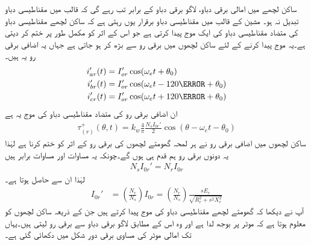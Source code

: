 ساکن لچھے میں امالی برقی دباو،  لاگو برقی دباو کے برابر تب رہے گی کہ قالب میں مقناطیسی دباو تبدیل نہ ہو۔ مشین کے قالب میں مقناطیسی دباو برقرار یوں رہتی ہے کہ ساکن لچھے  مقناطیسی دباو   کی متضاد مقناطیسی دباو کی ایک موج پیدا کرتی ہے جو اس کے اثر کو مکمل طور پر ختم کر دیتی ہے۔یہ موج پیدا کرنے کے لئے ساکن لچھوں میں برقی رو  سے بڑھ کر  ہو جاتی ہے جہاں یہ اضافی برقی رو یہ ہیں۔
\begin{gather}
\begin{aligned}\label{مساوات_امالی_تین_رو_الف}
i_{ar}'(t)&=I_{or}' \cos (\omega_e t+\theta_0)\\
i_{br}'(t)&=I_{or}' \cos (\omega_e t-120\degree+\theta_0)\\
i_{cr}'(t)&=I_{or}' \cos (\omega_e t+120\degree+\theta_0)
\end{aligned}
\end{gather}
ان اضافی برقی رو کی متضاد مقناطیسی دباو کی موج یہ ہے
\begin{align}
\tau_{(r)}^+(\theta,t)=k_w \frac{4}{\pi}\frac{N_s I_{0r}'}{2} \cos (\theta-\omega_e t -\theta_0)
\end{align}
ساکن لچھوں میں اضافی برقی رو نے ہر لمحہ گھومتے لچھوں کی برقی رو کے اثر کو ختم کرنا ہے لہٰذا یہ دونوں برقی رو ہم قدم ہی ہوں گے۔چونکہ یہ مساوات اور مساوات   برابر ہیں
\begin{align}
N_s I_{0r}'=N_r I_{0r}
\end{align}
 لہٰذا ان سے حاصل ہوتا ہے۔
\begin{align}
I_{0r}'&=\left(\frac{N_r}{N_s}\right) I_{0r}=\left(\frac{N_r}{N_s}\right) \frac{s E_r}{\sqrt{R_r^2+s^2 X_r^2}}
\end{align}
آپ نے دیکھا کہ گھومتے لچھے مقناطیسی دباو کی موج پیدا کرتے ہیں جن کے ذریعہ ساکن لچھوں کو معلوم ہوتا ہے کہ موٹر پر بوجھ لدا ہے اور وہ اس کے مطابق لاگو برقی دباو سے برقی رو لیتی ہیں۔یہاں تک امالی موٹر کی مساوی برقی دور شکل   میں دکھائی گئی ہے۔
